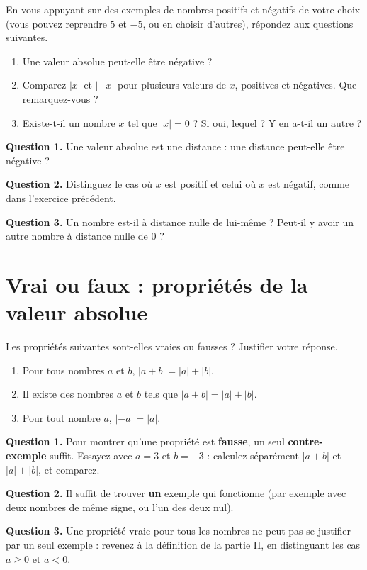 \documentclass[10pt,a4paper]{article}
\begin{document}
\begin{exo}[][]
    En vous appuyant sur des exemples de nombres positifs et négatifs de votre choix (vous pouvez reprendre \(5\) et \(-5\), ou en choisir d'autres), répondez aux questions suivantes.
    \begin{enumerate}
        \item Une valeur absolue peut-elle être négative ?
        \item Comparez \(|x|\) et \(|-x|\) pour plusieurs valeurs de \(x\), positives et négatives. Que remarquez-vous ?
        \item Existe-t-il un nombre \(x\) tel que \(|x|=0\) ? Si oui, lequel ? Y en a-t-il un autre ?
    \end{enumerate}

    \begin{indication}
        \textbf{Question 1.} Une valeur absolue est une distance : une distance peut-elle être négative ?

        \textbf{Question 2.} Distinguez le cas où \(x\) est positif et celui où \(x\) est négatif, comme dans l'exercice précédent.

        \textbf{Question 3.} Un nombre est-il à distance nulle de lui-même ? Peut-il y avoir un autre nombre à distance nulle de \(0\) ?
    \end{indication}
\end{exo}



\section{Vrai ou faux : propriétés de la valeur absolue}

\begin{exo}

    Les propriétés suivantes sont-elles vraies ou fausses ? Justifier votre réponse.
    \begin{enumerate}
        \item Pour tous nombres \(a\) et \(b\), \(|a+b| = |a|+|b|\).
        \item Il existe des nombres \(a\) et \(b\) tels que \(|a+b| = |a|+|b|\).
        \item Pour tout nombre \(a\), \(|-a|=|a|\).
    \end{enumerate}

    \begin{indication}
        \textbf{Question 1.} Pour montrer qu'une propriété est \textbf{fausse}, un seul \textbf{contre-exemple} suffit. Essayez avec \(a=3\) et \(b=-3\) : calculez séparément \(|a+b|\) et \(|a|+|b|\), et comparez.

        \textbf{Question 2.} Il suffit de trouver \textbf{un} exemple qui fonctionne (par exemple avec deux nombres de même signe, ou l'un des deux nul).

        \textbf{Question 3.} Une propriété vraie pour tous les nombres ne peut pas se justifier par un seul exemple : revenez à la définition de la partie II, en distinguant les cas \(a\geq 0\) et \(a<0\).
    \end{indication}
\end{exo}
\end{document}
